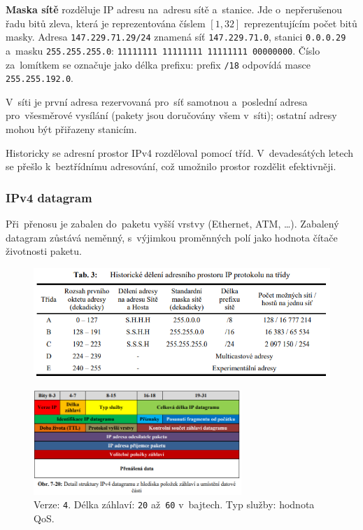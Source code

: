 \textbf{Maska sítě} rozděluje IP adresu na~adresu sítě a~stanice. Jde o~nepřerušenou řadu bitů zleva, která je reprezentována číslem $[1, 32]$ reprezentujícím počet bitů masky. Adresa \texttt{147.229.71.29/24} znamená síť \texttt{147.229.71.0}, stanici \texttt{0.0.0.29} a~masku \texttt{255.255.255.0}: \texttt{11111111 11111111 11111111 00000000}. Číslo za~lomítkem se označuje jako délka prefixu: prefix \texttt{/18} odpovídá masce \texttt{255.255.192.0}.

V~síti je první adresa rezervovaná pro~síť samotnou a~poslední adresa pro~všesměrové vysílání (pakety jsou doručovány všem v~síti); ostatní adresy mohou být přiřazeny stanicím.

Historicky se adresní prostor IPv4 rozděloval pomocí tříd. V~devadesátých letech se přešlo k~beztřídnímu adresování, což umožnilo prostor rozdělit efektivněji.

\subsubsection{IPv4 datagram}

Při~přenosu je zabalen do~paketu vyšší vrstvy (Ethernet, ATM, \dots). Zabalený datagram zůstává neměnný, s~výjimkou proměnných polí jako hodnota čítače životnosti paketu.

\clearpage
\begin{figure}
	\centering
	\includegraphics[width=\textwidth]{images/q07_ip_classes}
\end{figure}

\begin{figure}
	\centering
	\includegraphics[width=0.7\textwidth]{images/q07_ip_packet}
	\caption*{Verze: \texttt{4}. Délka záhlaví: \texttt{20} až~\texttt{60} v~bajtech. Typ služby: hodnota QoS. }
\end{figure}

